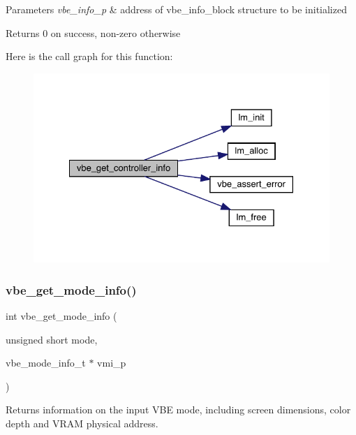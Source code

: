 \begin{DoxyParams}{Parameters}
{\em vbe\+\_\+info\+\_\+p} & address of vbe\+\_\+info\+\_\+block structure to be initialized \\
\hline
\end{DoxyParams}
\begin{DoxyReturn}{Returns}
0 on success, non-\/zero otherwise 
\end{DoxyReturn}
Here is the call graph for this function\+:\nopagebreak
\begin{figure}[H]
\begin{center}
\leavevmode
\includegraphics[width=328pt]{group__vbe_ga802bfdaa0b951c9fc68eff68d1b27436_cgraph}
\end{center}
\end{figure}
\hypertarget{group__vbe_ga4ef3234e41f2050bc094a22049b69e45}{}\label{group__vbe_ga4ef3234e41f2050bc094a22049b69e45} 
\subsubsection{\texorpdfstring{vbe\+\_\+get\+\_\+mode\+\_\+info()}{vbe\_get\_mode\_info()}}
{\footnotesize\ttfamily int vbe\+\_\+get\+\_\+mode\+\_\+info (\begin{DoxyParamCaption}\item[{unsigned short}]{mode,  }\item[{vbe\+\_\+mode\+\_\+info\+\_\+t $\ast$}]{vmi\+\_\+p }\end{DoxyParamCaption})}



Returns information on the input V\+BE mode, including screen dimensions, color depth and V\+R\+AM physical address. 

